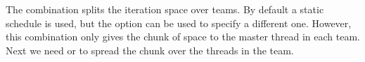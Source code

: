 The combination  splits the iteration space over teams.
By default a static schedule is used,
but the option  can be used to specify a different one.
However, this combination only gives the chunk of space to the master thread
in each team.
Next we need  or  to spread the chunk over the
threads in the team.
